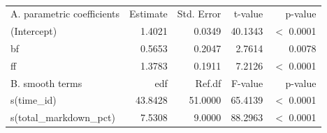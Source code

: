 

\begin{table}[H]
\centering
\begin{tabular}{lrrrr}
   \hline
A. parametric coefficients & Estimate & Std. Error & t-value & p-value \\ 
  (Intercept) & 1.4021 & 0.0349 & 40.1343 & $<$ 0.0001 \\ 
  bf & 0.5653 & 0.2047 & 2.7614 & 0.0078 \\ 
  ff & 1.3783 & 0.1911 & 7.2126 & $<$ 0.0001 \\ 
   \hline
B. smooth terms & edf & Ref.df & F-value & p-value \\ 
  s(time\_id) & 43.8428 & 51.0000 & 65.4139 & $<$ 0.0001 \\ 
  s(total\_markdown\_pct) & 7.5308 & 9.0000 & 88.2963 & $<$ 0.0001 \\ 
   \hline
\end{tabular}
\caption{ } 
\label{tab.gam}
\end{table}




